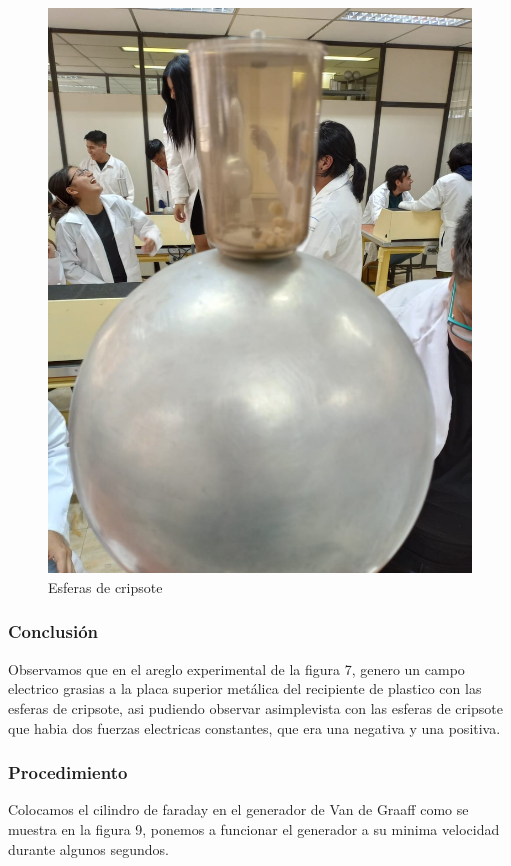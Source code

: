 \documentclass[10pt]{article}
\begin{document}
\begin{multicols}{2}
\begin{figure}[h]
\includegraphics[scale=0.07]{p11}
\caption{Esferas de cripsote}
\end{figure}

\subsubsection*{Conclusión}
Observamos que en el areglo experimental de la figura 7, genero un campo electrico  grasias a la placa superior metálica del recipiente de plastico con las esferas de cripsote, asi pudiendo observar asimplevista con las esferas de cripsote que habia dos fuerzas electricas constantes, que era una negativa y una positiva.

\subsubsection*{Procedimiento}
Colocamos el cilindro de faraday en el generador de Van de Graaff como se muestra en la figura 9, ponemos a funcionar el generador a su minima velocidad durante algunos segundos.


\end{multicols}
\end{document}
